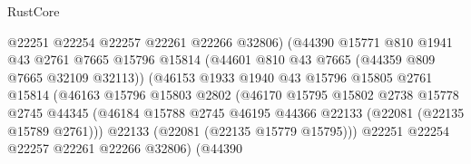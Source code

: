 \begin{lexlean}{RustCore}
\begin{coremodule}
                                        @22251
                                        @22254
                                        @22257
                                        @22261
                                        @22266
                                        @32806)
                                      (@44390
                                        @15771
                                        @810
                                        @1941
                                        @43
                                        @2761
                                        @7665
                                        @15796
                                        @15814
                                        (@44601 @810 @43 @7665 (@44359 @809 @7665 @32109 @32113))
                                        (@46153
                                          @1933
                                          @1940
                                          @43
                                          @15796
                                          @15805
                                          @2761
                                          @15814
                                          (@46163
                                            @15796
                                            @15803
                                            @2802
                                            (@46170
                                              @15795
                                              @15802
                                              @2738
                                              @15778
                                              @2745
                                              @44345
                                              (@46184
                                                @15788
                                                @2745
                                                @46195
                                                @44366
                                                @22133
                                                (@22081 (@22135 @15789 @2761)))
                                              @22133
                                              (@22081 (@22135 @15779 @15795)))
                                            @22251
                                            @22254
                                            @22257
                                            @22261
                                            @22266
                                            @32806)
                                          (@44390

\end{coremodule}
\end{lexlean}

